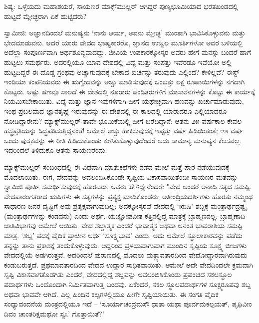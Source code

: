 ಶಿಷ್ಯ: ಒಳ್ಳೆಯದು ಮಹಾಶಯರೆ, ಸಾಯಣರೆ ಮಾಕ್ಸ್‌ಮುಲ್ಲರ್ ಆಗಿದ್ದರೆ ಪುಣ್ಯಭೂಮಿಯಾದ ಭರತಖಂಡದಲ್ಲಿ ಹುಟ್ಟದೆ ಮ್ಲೇಚ್ಛರಾಗಿ ಏಕೆ ಹುಟ್ಟಿದರು?

ಸ್ವಾಮೀಜಿ: ಅಜ್ಞಾನದಿಂದಲೆ ಮನುಷ್ಯನು ‘ನಾನು ಆರ್ಯ, ಅವನು ಮ್ಲೇಚ್ಛ’ ಮುಂತಾಗಿ ಭಾವಿಸಿಕೊಳ್ಳುವನು ಮತ್ತು ಭೇದಮಾಡುವನು. ಆದರೆ ಯಾರು ವೇದದ ಭಾಷ್ಯಕಾರರೊ, ಜ್ಞಾನದ ಉಜ್ವಲ ಮೂರ್ತಿಗಳೋ ಅವರ ಬಳಿಯಲ್ಲಿ ಅದೆಲ್ಲಾ ಸಂಪೂರ್ಣವಾಗಿ ಅರ್ಥಶೂನ್ಯವಾದದ್ದು. ಜೀವಿಯ ಉಪಕಾರಕ್ಕೋಸ್ಕರ ಅವರು ಹೇಗೆ ಮನಸ್ಸು ಬಂದರೆ ಹಾಗೆ ಹುಟ್ಟಲು ಸಮರ್ಥರು. ಅದರಲ್ಲಿಯೂ ಯಾವ ದೇಶದಲ್ಲಿ ವಿದ್ಯೆ ಮತ್ತು ಸಂಪತ್ತು ಇವೆರಡೂ ಇವೆಯೋ ಅಲ್ಲಿ ಹುಟ್ಟದಿದ್ದರೆ ಈ ದೊಡ್ಡ ಗ್ರಂಥವು ಅಚ್ಚಾಗುವುದಕ್ಕೆ ಬೇಕಾದ ಖರ್ಚನ್ನು ತರುವುದು ಎಲ್ಲಿಂದ? ಕೇಳಿಲ್ಲವೆ? ಈಸ್ಟ್ ಇಂಡಿಯಾ ಕಂಪನಿಯವರು ಈ ಋಗ್ವೇದವನ್ನು ಅಚ್ಚು ಮಾಡಿಸುವುದಕ್ಕೆ ಒಂಬತ್ತು ಲಕ್ಷ ರೂಪಾಯಿಗಳನ್ನು ನಗದಾಗಿ ಕೊಟ್ಟರು. ಅಷ್ಟು ಹಣವೂ ಸಾಲದೆ ಈ ದೇಶದಲ್ಲಿ ನೂರಾರು ಪಂಡಿತರುಗಳಿಗೆ ಮಾಸಾಶನಗಳನ್ನು ಕೊಟ್ಟು ಈ ಕಾರ್ಯಕ್ಕೆ ನಿಯಮಿಸಬೇಕಾಯಿತು. ವಿದ್ಯೆ ಮತ್ತು ಜ್ಞಾನ ಇವುಗಳಿಗಾಗಿ ಹೀಗೆ ಯಥೇಚ್ಛವಾಗಿ ಹಣವನ್ನು ಖರ್ಚುಮಾಡುವುದು, ಇಂಥ ಪ್ರಬಲವಾದ ಜ್ಞಾನತೃಷ್ಣೆ ಇರುವುದನ್ನು ಈ ದೇಶದಲ್ಲಿ ಈ ಕಾಲದಲ್ಲಿ ಯಾರಾದರೂ ಎಲ್ಲಿಯಾದರೂ ನೋಡಿದ್ದಾರೇನು? ಮ್ಯಾಕ್ಸ್‌ಮುಲ್ಲರ್ ತಾವೇ ಭೂಮಿಕೆಯಲ್ಲಿ ಹೀಗೆ ಬರೆದಿದ್ದಾನೆ: ಆತನು ೨೫ ವರ್ಷಕಾಲ ಕೇವಲ ಹಸ್ಥಪ್ರತಿಯನ್ನು ಸಿದ್ಧಪಡಿಸುತ್ತಿದ್ದನಂತೆ! ಆಮೇಲೆ ಅಚ್ಚು ಹಾಕಿಸುವುದಕ್ಕೆ ಇಪ್ಪತ್ತು ವರ್ಷ ಹಿಡಿಯಿತಂತೆ; ೪೫ ವರ್ಷ ಒಂದು ಪುಸ್ತಕವನ್ನು ಈ ರೀತಿ ಹಿಡಿದುಕೊಂಡು ಕುಳಿತುಕೊಳ್ಳುವುದೆಂದರೆ ಅದು ಸಾಮಾನ್ಯ ಮನುಷ್ಯನ ಕೆಲಸವಲ್ಲ. ಇದರಿಂದಲೆ ತಿಳಿದುಕೊ ಆತನು ಸಾಯಣರೆಂದು.

ಮ್ಯಾಕ್ಸ್‌ಮುಲ್ಲರ್ ಸಂಬಂಧದಲ್ಲಿ ಈ ವಿಧವಾಗಿ ಮಾತುಕಥೆಗಳು ನಡೆದ ಮೇಲೆ ಮತ್ತೆ ಪಾಠ ನಡೆಯುವುದಕ್ಕೆ ಮೊದಲಾಯಿತು. ಈಗ, ವೇದವನ್ನು ಅವಲಂಬಿಸಿಕೊಂಡೇ ಸೃಷ್ಟಿಯ ವಿಕಾಸವಾಯಿತೆಂಬೀ ಸಾಯಣರ ಮತವನ್ನು ಸ್ವಾಮಿಜಿ ಪೂರ್ತಿ ಸಮರ್ಥಿಸುವುದಕ್ಕೆ ಹೊರಟರು. ಅವರು ಹೇಳಿದ್ದೇನೆಂದರೆ: "ವೇದ ಅಂದರೆ ಅನಾದಿ ಸತ್ಯದ ಸಮಷ್ಟಿ. ವೇದಪಾರಂಗತರಾದ ಋಷಿಗಳು ಈ ಸತ್ಯಗಳನ್ನು ಪ್ರತ್ಯಕ್ಷ ಮಾಡಿಕೊಂಡರು; ಅತೀಂದ್ರಿಯದರ್ಶಿಗಳು ಹೊರತು ನಮ್ಮಂಥ ಸಾಧಾರಣ ಜನರ ದೃಷ್ಟಿಗೆ ಅವು ಪ್ರತ್ಯಕ್ಷವಾಗುವುದಿಲ್ಲ: ಅದಕ್ಕೋಸ್ಕರವೆ ವೇದದಲ್ಲಿ ‘ಋಷಿ’ ಶಬ್ದಕ್ಕೆ ಮಂತ್ರಾರ್ಥದ್ರಷ್ಟೃ (ಮಂತ್ರಾರ್ಥಗಳನ್ನು ಕಂಡವನು) ಎಂದು ಅರ್ಥ. ಯಜ್ಞೋಪವೀತ ಕತ್ತಿನಲ್ಲಿದ್ದ ಮಾತ್ರಕ್ಕೆ ಬ್ರಾಹ್ಮಣನಲ್ಲ. ಬ್ರಾಹ್ಮಣಾದಿ ಜಾತಿವಿಭಾಗವು ಆಮೇಲೆ ಆಯಿತು. ವೇದ ಶಬ್ದಾತ್ಮಕ ಎಂದರೆ ಭಾವಾತ್ಮಕ ಅಥವಾ ಅನಂತ ಭಾವರಾಶಿಯ ಸಮಷ್ಟಿ ಮಾತ್ರ. ‘ಶಬ್ದ’ ಪದಕ್ಕೆ ವೈದಿಕ ಪ್ರಾಚೀನ ಅರ್ಥ ‘ಸೂಕ್ಷ್ಮಭಾವ’ ಎಂದು. ಅದು ಆಮೇಲೆ ಸ್ಥೂಲಾಕಾರವನ್ನು ಪಡೆದು ತನ್ನನ್ನು ತಾನು ಪ್ರಕಾಶಕ್ಕೆ ತಂದುಕೊಳ್ಳುವುದು. ಆದ್ದರಿಂದ ಪ್ರಳಯವಾಗುವಾಗ ಮುಂದಿನ ಸೃಷ್ಟಿಯ ಸೂಕ್ಷ್ಮ ಬೀಜಗಳು ವೇದದಲ್ಲಿಯೆ ಅಡಗಿರುತ್ತವೆ. ಅದರಿಂದಲೆ ಪುರಾಣದಲ್ಲಿ ಮೊದಲು ಮತ್ಸ್ಯಾವತಾರದಿಂದ ವೇದೋದ್ಧಾರವಾಗಿರುವುದು ಕಂಡುಬರುತ್ತದೆ. ಪ್ರಥಮಾವತಾರದಿಂದ ವೇದದ ಉದ್ಧಾರ ಸಾಧಿತವಾಯಿತು. ಆಮೇಲೆ ಅದೇ ವೇದದಿಂದಲೇ ಕ್ರಮವಾಗಿ ಸೃಷ್ಟಿ ವಿಕಾಸವಾಗತೊಡಗಿತು ಎಂದರೆ, ವೇದದಲ್ಲಿದ್ದ ಶಬ್ದವನ್ನು ಅವಲಂಬಿಸಿಕೊಂಡು ಪ್ರಪಂಚದ ಸಕಲಸ್ಥೂಲ ಪದಾರ್ಥಗಳು ಒಂದೊಂದಾಗಿ ನಿರ್ಮಿತವಾಗುತ್ತ ಬಂದವು. ಏಕೆಂದರೆ, ಸಕಲ ಸ್ಥೂಲಪದಾರ್ಥಗಳ ಸೂಕ್ಷ್ಮರೂಪವು ಶಬ್ದ ಅಥವಾ ಭಾವವೇ ಆಗಿದೆ. ಎಲ್ಲ ಹಿಂದಿನ ಕಲ್ಪಗಳಲ್ಲಿಯೂ ಹೀಗೇ ಸೃಷ್ಟಿಯಾಯಿತು. ಈ ಸಂಗತಿ ವೈದಿಕ ಸಂಧ್ಯಾವಂದನೆಯ ಮಂತ್ರದಲ್ಲಿಯೂ ಇದೆ – ‘ಸೂರ್ಯಾಚಂದ್ರಮಸೌ ಧಾತಾ ಯಥಾ ಪೂರ್ವಮಕಲ್ಪಯತ್, ಪೃಥಿವೀಂ ದಿವಂ ಚಾಂತರಿಕ್ಷಮಥೋ ಸ್ವಃ.’ ಗೊತ್ತಾಯಿತೆ?"

